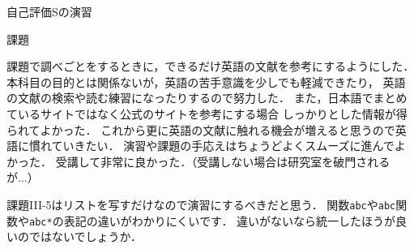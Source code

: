 \documentclass[a4paper, 10pt]{ltjsarticle}
\begin{document}

\noindent\textsf{\LARGE 自己評価Sの演習}
\vspace{\baselineskip}



\newpage


\noindent\textsf{\LARGE 課題}







\newpage


\vspace{0.5\baselineskip}

課題で調べごとをするときに，できるだけ英語の文献を参考にするようにした．
本科目の目的とは関係ないが，英語の苦手意識を少しでも軽減できたり，
英語の文献の検索や読む練習になったりするので努力した．
また，日本語でまとめているサイトではなく公式のサイトを参考にする場合
しっかりとした情報が得られてよかった．
これから更に英語の文献に触れる機会が増えると思うので英語に慣れていきたい．
演習や課題の手応えはちょうどよくスムーズに進んでよかった．
受講して非常に良かった．（受講しない場合は研究室を破門されるが...）

\vspace{0.5\baselineskip}
\vspace{0.5\baselineskip}

課題III-5はリストを写すだけなので演習にするべきだと思う．
関数\texttt{abc}や\texttt{abc}関数や\texttt{abc*}の表記の違いがわかりにくいです．
違いがないなら統一したほうが良いのではないでしょうか．
\end{document}
